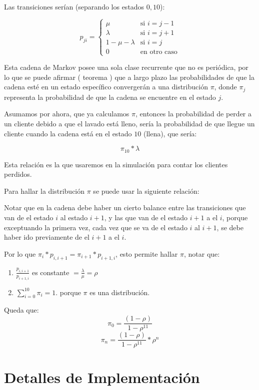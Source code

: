 \documentclass[14pt]{extarticle}
\begin{document}
Las transiciones serían (separando los estados $0, 10$):

$$
p_{ji} = \begin{cases}
  \mu  & \text{si $i = j-1$} \\
  \lambda  & \text{si $i = j+1$} \\
  1 - \mu  - \lambda  & \text{si $i = j$} \\
  0 & \text{en otro caso}
        \end{cases}
$$

Esta cadena de Markov posee una sola clase recurrente que no es periódica, por lo que se puede afirmar ( teorema ) que a largo plazo las probabilidades de que la cadena esté en un estado específico convergerán a una distribución $\pi$, donde $\pi_j$ representa la probabilidad de que la cadena se encuentre en el estado $j$. 

Asumamos por ahora, que ya calculamos $\pi$, entonces la probabilidad de perder a un cliente debido a que el lavado está lleno, sería la probabilidad de que llegue un cliente cuando la cadena está en el estado $10$ (llena), que sería:

$$\pi_{10} * \lambda $$

Esta relación es la que usaremos en la simulación para contar los clientes perdidos.

Para hallar la distribución $\pi$ se puede usar la siguiente relación:

Notar que en la cadena debe haber un cierto balance entre las transiciones que van de el estado $i$ al estado $i+1$, y las que van de el estado $i+1$ a el $i$, porque exceptuando la primera vez, cada vez que se va de el estado $i$ al $i+1$, se debe haber ido previamente de el $i+1$ a el $i$.

Por lo que $\pi_i * p_{i, i+1} = \pi_{i+1} * p_{i+1, i}$, esto permite hallar $\pi$, notar que:

\begin{enumerate}
    \item $\frac{p_{i, i+1}}{p_{i+1, i}}$ es constante $= \frac{ \lambda}{ \mu}  = \rho$
    \item $\sum_{i = 0}^{10} \pi_i = 1$. porque $\pi$ es una distribución.
\end{enumerate}

Queda que: 
	$$\pi_0 = \frac{(1 - \rho)}{1 - \rho^{11}}$$
	$$\pi_n = \frac{(1 - \rho)} { 1 - \rho^{11}} * \rho^n$$

\section{Detalles de Implementación}
\end{document}
